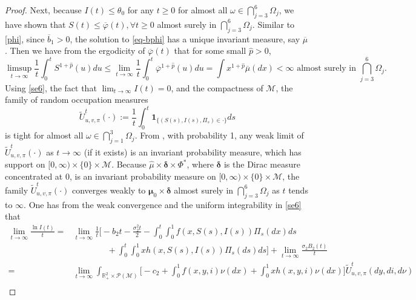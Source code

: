 \documentclass[12pt]{amsart}
\newcommand{\red}[1]{{\leavevmode\color{red}#1}}
\theoremstyle{remark}
\numberwithin{equation}{section}
\newcommand{\M}{\mathcal{M}}
\newcommand{\R}{\mathbb{R}}
\numberwithin{equation}{section}
\newcommand{\wdt}{\widetilde}
\newcommand{\1}{\boldsymbol{1}}
\newcommand{\bmu}{\boldsymbol{\mu}}
\newcommand{\bdelta}{\boldsymbol{\delta}}
\def\bar{\overline}
\def\hat{\widehat}
\begin{document}
\begin{proof}
Next, because $I(t)\leq \theta_0$ for any $t\geq 0$ for almost all $\omega	\in\bigcap_{j=3}^6\Omega_j$, we have shown that $S(t)\leq \bar\varphi(t), \forall t\geq 0$ almost surely in $\bigcap_{j=3}^6\Omega_j$.
Similar to \eqref{phi}, since $\bar b_1>0$,
the solution to \eqref{eq-bphi} has a unique invariant measure, say $\bar\mu$.
Then we have from the ergodicity of $\bar \varphi(t)$ that for some small $\hat p>0$,
\begin{equation}\label{se6}
\limsup_{t\to\infty}\frac1t\int_0^t S^{1+\hat p}(u)du\leq \lim_{t\to\infty}\frac1t\int_0^t \bar\varphi^{1+\hat p}(u)du=\int x^{1+\hat p}\bar\mu(dx)<\infty \text{ almost surely in }\bigcap_{j=3}^6\Omega_j.
\end{equation} 	
Using \eqref{se6}, the fact that $\lim_{t\to\infty} I(t)=0$, and the compactness of $\M$,
the family of random occupation measures
$$\wdt U^t_{u,v,\pi}(\cdot):=\frac 1t\int_0^t \1_{\{(S(s),I(s),\Pi_s)\in \cdot\}}ds$$ is tight for almost all $\omega\in\bigcap_{j=1}^3\Omega_j$.
From \cite[Lemma 5.6]{HN18},
with probability 1, any weak limit of $\wdt U^t_{u,v,\pi}(\cdot)$ as $t\to\infty$ (if it exists)
is an invariant probability measure,
which has support on $[0,\infty)\times\{0\}\times\M.$	
Because $\hat\mu\times\bdelta\times\Phi^*$, where $\bdelta$ is the Dirac measure concentrated at $0$, is an
invariant probability measure on $[0,\infty)\times\{0\}\times\M$, the family
$\wdt U^t_{u,v,\pi}(\cdot)$ converges weakly to $\bmu_0\times\bdelta$ almost surely in $ \bigcap_{j=3}^6\Omega_j$ as $t$ tends to $ \infty$.
One has from the weak
convergence
and the uniform integrability
in
\eqref{se6} that
$$
\begin{aligned}
\lim_{t\to\infty}\frac{\ln I(t)}t=&\lim_{t\to\infty}\frac1t\bigg[
-b_2t-\frac{\sigma_2^2t}2-\int_0^t\int_0^1f(x,S(s),I(s))\Pi_s(dx)ds \\
&\qquad\qquad +\int_0^t\int_0^1xh(x,S(s),I(s))\Pi_s(ds)ds\bigg]+\lim_{t\to\infty}\frac{\sigma_2B_2(t)}t\\
=&\lim_{t\to\infty}\!\int_{\R^2_+\times\mathcal P(\M)}\!\!\Big[\!-c_2 +\int_0^1f(x,y,i)\nu(dx)+\int_0^1 xh(x,y,i)\nu(dx)\!\Big]\wdt U^t_{u,v,\pi}(dy,di,d\nu)\\

\end{aligned}$$
\end{proof}
\end{document}
